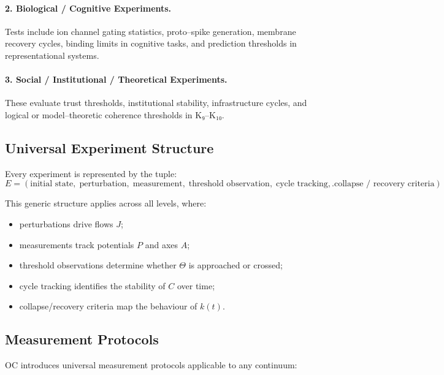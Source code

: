 \paragraph{2. Biological / Cognitive Experiments.}  
Tests include ion channel gating statistics, proto–spike generation,
membrane recovery cycles, binding limits in cognitive tasks, and prediction
thresholds in representational systems.

\paragraph{3. Social / Institutional / Theoretical Experiments.}  
These evaluate trust thresholds, institutional stability, infrastructure
cycles, and logical or model–theoretic coherence thresholds in K₉–K₁₀.


\subsection{Universal Experiment Structure}

Every experiment is represented by the tuple:
\[
   E = (\text{initial state},\;
         \text{perturbation},\;
         \text{measurement},\;
         \text{threshold observation},\;
         \text{cycle tracking},\;
         \text{collapse / recovery criteria}).
\]

This generic structure applies across all levels, where:

\begin{itemize}
    \item perturbations drive flows $J$;
    \item measurements track potentials $P$ and axes $A$;
    \item threshold observations determine whether $\Theta$ is approached or
          crossed;
    \item cycle tracking identifies the stability of $C$ over time;
    \item collapse/recovery criteria map the behaviour of $k(t)$.
\end{itemize}


\subsection{Measurement Protocols}

OC introduces universal measurement protocols applicable to any continuum:

